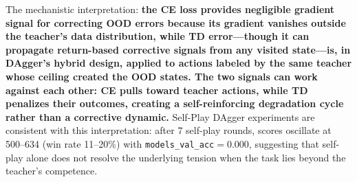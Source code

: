 \documentclass[11pt,a4paper]{article}
\theoremstyle{definition}
\begin{document}
The mechanistic interpretation: \textbf{the CE loss provides negligible gradient signal for correcting OOD errors because its gradient vanishes outside the teacher's data distribution, while TD error---though it can propagate return-based corrective signals from any visited state---is, in DAgger's hybrid design, applied to actions labeled by the same teacher whose ceiling created the OOD states. The two signals can work against each other: CE pulls toward teacher actions, while TD penalizes their outcomes, creating a self-reinforcing degradation cycle rather than a corrective dynamic.}
Self-Play DAgger experiments are consistent with this interpretation: after 7 self-play rounds, scores oscillate at 500--634 (win rate 11--20\%) with \texttt{models\_val\_acc}$=0.000$, suggesting that self-play alone does not resolve the underlying tension when the task lies beyond the teacher's competence.
\end{document}

